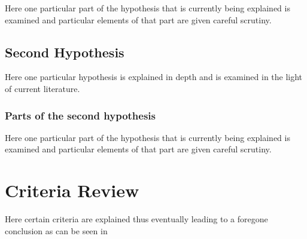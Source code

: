 Here one particular part of the hypothesis that is
currently being explained is examined and particular
elements of that part are given careful scrutiny.


\subsection{Second Hypothesis}

Here one particular hypothesis is explained in depth
and is examined in the light of current literature.

\subsubsection{Parts of the second hypothesis}

Here one particular part of the hypothesis that is
currently being explained is examined and particular
elements of that part are given careful scrutiny.

\section{Criteria Review}

Here certain criteria are explained thus eventually
leading to a foregone conclusion as can be seen in




%
%
